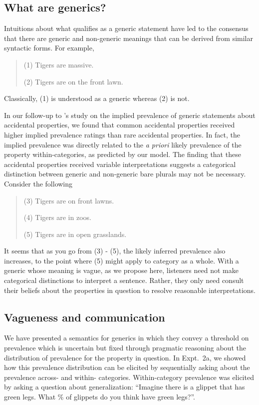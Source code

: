\documentclass[10pt,letterpaper]{article}
\begin{document}
\subsection{What are generics?}

Intuitions about what qualifies as a generic statement have led to the consensus that there are generic and non-generic meanings that can be derived from similar syntactic forms. For example,
\begin{quotation}
	(1) Tigers are massive. 
	
	(2) Tigers are on the front lawn.
\end{quotation}

Classically, (1) is understood as a generic whereas (2) is not. 

In our follow-up to \citeauthor{Cimpian2010}'s study on the implied prevalence of generic statements about accidental properties, we found that common accidental properties received higher implied prevalence ratings than rare accidental properties. 
In fact, the implied prevalence was directly related to the \emph{a priori} likely prevalence of the property within-categories, as predicted by our model.
The finding that these accidental properties received variable interpretations suggests a categorical distinction between generic and non-generic bare plurals may not be necessary. 
Consider the following 

\begin{quotation}
	(3) Tigers are on front lawns. 
	
	(4) Tigers are in zoos.
	
	(5) Tigers are in open grasslands.
\end{quotation}

It seems that as you go from (3) - (5), the likely inferred prevalence also increases, to the point where (5) might apply to category as a whole. 
With a generic whose meaning is vague, as we propose here, listeners need not make categorical distinctions to interpret a sentence. 
Rather, they only need consult their beliefs about the properties in question to resolve reasonable interpretations. 

\subsection{Vagueness and communication}

We have presented a semantics for generics in which they convey a threshold on prevalence which is uncertain but fixed through pragmatic reasoning about the distribution of prevalence for the property in question.
In Expt.~2a, we showed how this prevalence distribution can be elicited by sequentially asking about the prevalence across- and within- categories. 
Within-category prevalence was elicited by asking a question about generalization: ``Imagine there is a glippet that has green legs. What \% of glippets do you think have green legs?''.
\end{document}
